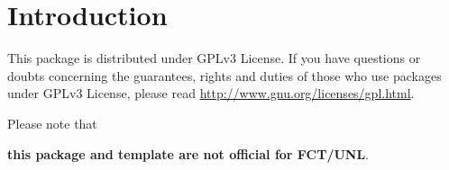 % 
%  
%
\chapter{Introduction}
\label{cha:introduction}

This package is distributed under GPLv3 License. If you have questions or  doubts concerning the guarantees, rights and duties of those who use packages under GPLv3 License, please read \url{http://www.gnu.org/licenses/gpl.html}.


Please note that 
\begin{center}
	\textbf{\large this package and template are not official for FCT/UNL}.
\end{center}

